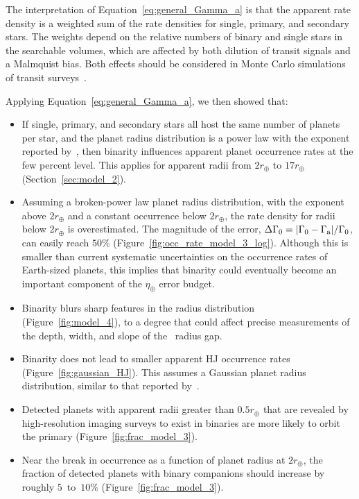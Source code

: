 \documentclass[12pt,modern]{aastex61}
\renewcommand{\a}{_{\rm a}}
\begin{document}
The interpretation of Equation~\ref{eq:general_Gamma_a} is that the
apparent rate density is a weighted sum of the rate densities for
single, primary, and secondary stars. The weights depend on the
relative numbers of binary and single stars in the searchable volumes,
which are affected by both dilution of transit signals and a Malmquist
bias.  Both effects should be considered in Monte Carlo simulations of
transit surveys~\citep[\textit{e.g.},][]{
  bakos_hatsouth:_2013,sullivan_transiting_2015, gunther_new_2017}.

Applying Equation~\ref{eq:general_Gamma_a}, we then showed that:
\begin{itemize}
%
\item If single, primary, and secondary stars all host the same number
  of planets per star, and the planet radius distribution is a power
    law with the exponent reported by~\citet{howard_planet_2012}, then
    binarity influences apparent planet occurrence rates at the few
    percent level. This applies for apparent radii from $2r_\oplus$ to
    $17r_\oplus$ (Section~\ref{sec:model_2}).
%
\item Assuming a broken-power law planet radius distribution, with the
  \citet{howard_planet_2012} exponent above $2r_\oplus$ and a constant
    occurrence below $2r_\oplus$, the rate density for radii below
    $2r_\oplus$ is overestimated. The magnitude of the error, $\Delta
    \Gamma_0 = |\Gamma_0 - \Gamma\a|/\Gamma_0$, can easily reach
    $50\%$ (Figure~\ref{fig:occ_rate_model_3_log}).  Although this is
    smaller than current systematic uncertainties on the occurrence
    rates of Earth-sized planets, this implies that binarity could
    eventually become an important component of the $\eta_\oplus$
    error budget.
%
\item Binarity blurs sharp features in the radius distribution
  (Figure~\ref{fig:model_4}), to a degree that could affect precise
    measurements of the depth, width, and slope of
    the~\citet{fulton_california-_2017} radius gap.
%
\item Binarity does not lead to smaller apparent HJ occurrence rates
  (Figure~\ref{fig:gaussian_HJ}).  This assumes a Gaussian planet
    radius distribution, similar to that reported
    by~\citet{petigura_CKS_2017}.
%
\item Detected planets with apparent radii greater than $0.5r_\oplus$
  that are revealed by high-resolution imaging surveys to exist in
    binaries are more likely to orbit the primary
    (Figure~\ref{fig:frac_model_3}).
%
\item Near the break in occurrence as a function of planet
  radius at $2r_\oplus$, the fraction of detected planets with
    binary companions should increase by roughly $5$~to~$10\%$
    (Figure~\ref{fig:frac_model_3}).
\end{itemize}
\end{document}

